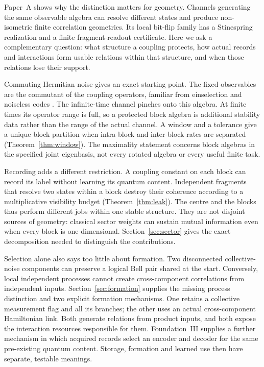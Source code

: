 \documentclass[12pt,a4paper]{article}
\begin{document}
Paper~A \cite{Liu2026PaperA} shows why the distinction matters for geometry. Channels generating the same observable algebra can resolve different states and produce non-isometric finite correlation geometries. Its local bit-flip family has a Stinespring realization and a finite fragment-readout certificate. Here we ask a complementary question: what structure a coupling protects, how actual records and interactions form usable relations within that structure, and when those relations lose their support.

Commuting Hermitian noise gives an exact starting point. The fixed observables are the commutant of the coupling operators, familiar from einselection and noiseless codes \cite{Zurek1982,Zurek2003,ZanardiRasetti1997,KnillLaflammeViola2000}. The infinite-time channel pinches onto this algebra. At finite times its operator range is full, so a protected block algebra is additional stability data rather than the range of the actual channel. A window and a tolerance give a unique block partition when intra-block and inter-block rates are separated (Theorem~\ref{thm:window}). The maximality statement concerns block algebras in the specified joint eigenbasis, not every rotated algebra or every useful finite task.

Recording adds a different restriction. A coupling constant on each block can record its label without learning its quantum content. Independent fragments that resolve two states within a block destroy their coherence according to a multiplicative visibility budget (Theorem~\ref{thm:leak}). The centre and the blocks thus perform different jobs within one stable structure. They are not disjoint sources of geometry: classical sector weights can sustain mutual information even when every block is one-dimensional. Section~\ref{sec:sector} gives the exact decomposition needed to distinguish the contributions.

Selection alone also says too little about formation. Two disconnected collective-noise components can preserve a logical Bell pair shared at the start. Conversely, local independent processes cannot create cross-component correlations from independent inputs. Section~\ref{sec:formation} supplies the missing process distinction and two explicit formation mechanisms. One retains a collective measurement flag and all its branches; the other uses an actual cross-component Hamiltonian link. Both generate relations from product inputs, and both expose the interaction resources responsible for them. Foundation~III \cite{PaperFIII} supplies a further mechanism in which acquired records select an encoder and decoder for the same pre-existing quantum content. Storage, formation and learned use then have separate, testable meanings.
\end{document}

